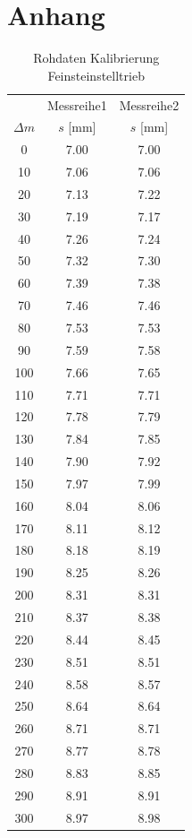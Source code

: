 \documentclass[12pt,a4paper]{article}
\begin{document}
\section{Anhang}
\begin{table}[!htb]
	\begin{minipage}{.5\linewidth}
		\centering
		\begin{table}[H]
			\centering
			\begin{tabular}{|c|c|c|}
				\hline
				&Messreihe1&Messreihe2\\
				$\Delta m$&$s$ [mm]&$s$ [mm]\\
				\hline
				0&7.00&7.00\\
				10&7.06&7.06\\
				20&7.13&7.22\\
				30&7.19&7.17\\
				40&7.26&7.24\\
				50&7.32&7.30\\
				60&7.39&7.38\\
				70&7.46&7.46\\
				80&7.53&7.53\\
				90&7.59&7.58\\
				100&7.66&7.65\\
				110&7.71&7.71\\
				120&7.78&7.79\\
				130&7.84&7.85\\
				140&7.90&7.92\\
				150&7.97&7.99\\
				160&8.04&8.06\\
				170&8.11&8.12\\
				180&8.18&8.19\\
				190&8.25&8.26\\
				200&8.31&8.31\\
				210&8.37&8.38\\
				220&8.44&8.45\\
				230&8.51&8.51\\
				240&8.58&8.57\\
				250&8.64&8.64\\
				260&8.71&8.71\\
				270&8.77&8.78\\
				280&8.83&8.85\\
				290&8.91&8.91\\
				300&8.97&8.98\\
				\hline
			\end{tabular}
			\caption{Rohdaten Kalibrierung Feinsteinstelltrieb}

\end{table}
\end{minipage}
\end{table}
\end{document}
